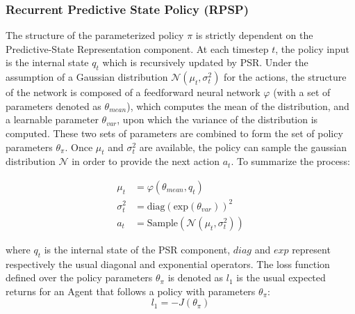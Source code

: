            \subsubsection{Recurrent Predictive State Policy (RPSP)}
                The structure of the parameterized policy $\pi$ is strictly dependent on the Predictive-State Representation component. At each timestep $t$, the policy input is the internal state $q_t$ which is recursively updated by PSR. Under the assumption of a Gaussian distribution $\mathcal{N}(\mu_{t}, \sigma_{t}^{2})$ for the actions, the structure of the network is composed of a feedforward neural network $\varphi$ (with a set of parameters denoted as $\theta_{mean}$), which computes the mean of the distribution, and a learnable parameter $\theta_{var}$, upon which the variance of the distribution is computed. These two sets of parameters are combined to form the set of policy parameters $\theta_\pi$. Once $\mu_{t}$ and $\sigma_{t}^{2}$ are available, the policy can sample the gaussian distribution $\mathcal{N}$ in order to provide the next action $a_t$. To summarize the process:
                
                \begin{align*}
                    \mu_{t} &= \varphi(\theta_{mean}, q_t)\\ \sigma_{t}^{2} &= \text{diag}(\text{exp}(\theta_{var}))^{2}\\
                    a_t &= \text{Sample}(\mathcal{N}(\mu_{t}, \sigma_{t}^{2}))
                \end{align*}
                
                where $q_t$ is the internal state of the PSR component, $diag$ and $exp$ represent respectively the usual diagonal and exponential operators. \newline
                The loss function defined over the policy parameters $\theta_\pi$ is denoted as $l_1$ is the usual expected returns for an Agent that follows a policy with parameters $\theta_\pi$:
                \[ l_1 = -J(\theta_\pi)\]
            
